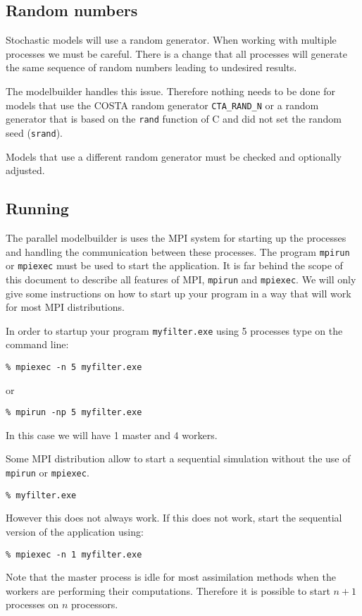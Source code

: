 \documentclass[a4paper,12pt]{article}
\begin{document}
\subsection{Random numbers}
Stochastic models will use a random generator. When working with multiple
processes we must be careful. There is a change that all processes will
generate the same sequence of random numbers leading to undesired results. 

The modelbuilder handles this issue. Therefore nothing needs to be done
for models that use the COSTA random generator
{\tt CTA\_RAND\_N} or a random generator that is based on the {\tt rand}
function of C and did not set the random seed ({\tt srand}).

Models that use a different random generator must be checked and optionally
adjusted.

\subsection{Running}
The parallel modelbuilder is uses the MPI system for starting up the
processes and handling the communication between these processes. The
program {\tt mpirun} or {\tt mpiexec} must be used to start the
application.  It is far behind the scope of this document to describe all
features of MPI, {\tt mpirun} and {\tt mpiexec}. We will only give some
instructions on how to start up your program in a way that will work for
most MPI distributions.

In order to startup your program {\tt myfilter.exe} using 5
processes type on the command line:
\begin{verbatim}
% mpiexec -n 5 myfilter.exe
\end{verbatim}
or 
\begin{verbatim}
% mpirun -np 5 myfilter.exe
\end{verbatim}
In this case we will have 1 master and 4 workers.

Some MPI distribution allow to start a sequential simulation without the
use of {\tt mpirun} or {\tt mpiexec}. 
\begin{verbatim}
% myfilter.exe
\end{verbatim}
However this does not always work. If this does not work, start the
sequential version of the application using:
\begin{verbatim}
% mpiexec -n 1 myfilter.exe
\end{verbatim}

Note that the master process is idle for most assimilation methods when the
workers are performing their computations. Therefore it is possible to
start $n+1$ processes on $n$ processors.
\end{document}
